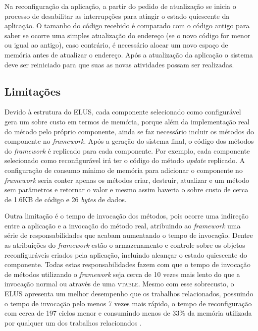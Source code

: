 \documentclass[12pt]{article}
\newcommand{\fig}[4][h]{
  \begin{figure}[#1] {\centering{\texttt{[image: fig/\#2]}}\par}
    \caption{#3\label{fig:#2}}
  \end{figure}
}
\newcommand{\vtable}{\textsc{vtable}}
\begin{document}
Na reconfiguração da aplicação, a partir do pedido de atualização se inicia o processo de desabilitar as interrupções para atingir o estado quiescente da aplicação. O tamanho do código recebido é comparado com o código antigo para saber se ocorre uma simples atualização do endereço (se o novo código for menor ou igual ao antigo), caso contrário, é necessário alocar um novo espaço de memória antes de atualizar o endereço. Após a atualização da aplicação o sistema deve ser reiniciado para que suas as novas atividades possam ser realizadas.


\subsection{Limitações}
Devido à estrutura do ELUS, cada componente selecionado como configurável gera um sobre custo em termos de memória, porque além da implementação real do método pelo próprio componente, ainda se faz necessário incluir os métodos do componente no \textit{framework}. Após a geração do sistema final, o código dos métodos do \textit{framework} é replicado para cada componente. Por exemplo, cada componente selecionado como reconfigurável irá ter o código do método \textit{update} replicado. A configuração de consumo mínimo de memória para adicionar o componente no \textit{framework} seria conter apenas os métodos criar, destruir, atualizar e um método sem parâmetros e retornar o valor e mesmo assim haveria o sobre custo de cerca de 1.6KB de código e 26 \textit{bytes} de dados. 

Outra limitação é o tempo de invocação dos métodos, pois ocorre uma indireção entre a aplicação e a invocação do método real, atribuindo ao \textit{framework} uma série de responsabilidades que acabam aumentando o tempo de invocação. Dentre as atribuições do \textit{framework} estão o armazenamento e controle sobre os objetos reconfiguráveis criados pela aplicação, incluindo alcançar o estado quiescente do componente. Todas estas responsabilidades fazem com que o tempo de invocação de métodos utilizando o \textit{framework} seja cerca de 10 vezes mais lento do que a invocação normal ou através de uma \vtable{}. Mesmo com esse sobrecusto, o ELUS apresenta um melhor desempenho que os trabalhos relacionados, possuindo o tempo de invocação pelo menos 7 vezes mais rápido, o tempo de reconfiguração com cerca de 197 ciclos menor e consumindo menos de 33\% da memória utilizada por qualquer um dos trabalhos relacionados \cite{gracioli2010elus}.
\end{document}
